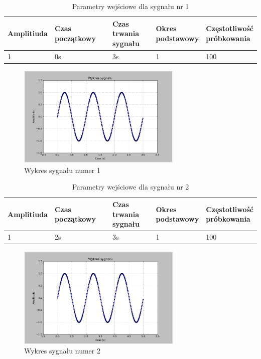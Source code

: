 \documentclass{article}
\begin{document}
{{    \begin{table}[h!]
        \centering
        \begin{tabular}{|l|l|l|l|l|}
            \hline
            Amplitiuda & Czas początkowy & \shortstack{Czas trwania \\ sygnału} & \shortstack{Okres \\ podstawowy} & \shortstack{Częstotliwość\\ próbkowania}   \\ \hline
            1 & 0s & 3s & 1 & 100           \\ \hline
        \end{tabular}
        \caption{Parametry wejściowe dla sygnału nr 1}
    \end{table}
    \begin{figure}[h!]
        \centering
        \includegraphics[width=0.7\textwidth]{img/splot1.png}
        \caption{Wykres sygnału numer 1}
    \end{figure}

    \begin{table}[h!]
        \centering
        \begin{tabular}{|l|l|l|l|l|}
            \hline
            Amplitiuda & Czas początkowy & \shortstack{Czas trwania \\ sygnału} & \shortstack{Okres \\ podstawowy} & \shortstack{Częstotliwość\\ próbkowania}   \\ \hline
            1 & 2s & 3s & 1 & 100           \\ \hline
        \end{tabular}
        \caption{Parametry wejściowe dla sygnału nr 2}
    \end{table}
    \begin{figure}[h!]
        \centering
        \includegraphics[width=0.7\textwidth]{img/splot2.png}
        \caption{Wykres sygnału numer 2}
    \end{figure}

}}
\end{document}
